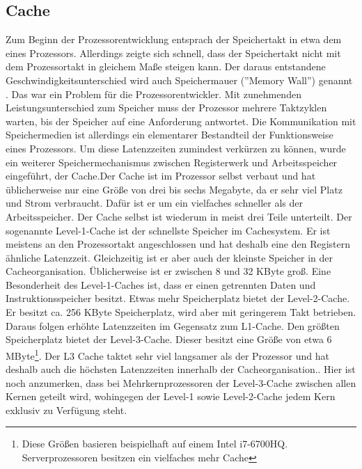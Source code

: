 \documentclass[a4paper,12pt]{article}
\begin{document}
\subsection{Cache} \label{subsec:cache}
Zum Beginn der Prozessorentwicklung entsprach der Speichertakt in etwa dem eines Prozessors. Allerdings zeigte sich schnell, dass der Speichertakt nicht mit dem Prozessortakt in gleichem Maße steigen kann. Der daraus entstandene Geschwindigkeitsunterschied wird auch Speichermauer (''Memory Wall'') genannt \cite{mckee2004reflections}.
Das war ein Problem für die Prozessorentwickler. Mit zunehmenden Leistungsunterschied zum Speicher muss der Prozessor mehrere Taktzyklen warten,  bis der Speicher auf eine Anforderung antwortet.\cite{mikroprozessortechnik2011} Die Kommunikation mit Speichermedien ist allerdings ein elementarer Bestandteil der Funktionsweise eines Prozessors. Um diese Latenzzeiten zumindest verkürzen zu können, wurde ein weiterer Speichermechanismus zwischen Registerwerk und Arbeitsspeicher eingeführt, der Cache.\newpage\noindent Der Cache ist im Prozessor selbst verbaut und hat üblicherweise nur eine Größe von drei bis sechs Megabyte, da er sehr viel Platz und Strom verbraucht. Dafür ist er um ein vielfaches schneller als der Arbeitsspeicher. Der Cache selbst ist wiederum in meist drei Teile unterteilt. Der sogenannte Level-1-Cache ist der schnellste Speicher im Cachesystem. Er ist meistens an den Prozessortakt angeschlossen und hat deshalb eine den Registern ähnliche Latenzzeit. Gleichzeitig ist er aber auch der kleinste Speicher in der Cacheorganisation. 
Üblicherweise ist er zwischen 8 und 32 KByte groß. Eine Besonderheit des Level-1-Caches ist, dass er  einen getrennten Daten und Instruktionsspeicher besitzt. Etwas mehr Speicherplatz bietet der Level-2-Cache. Er besitzt ca. 256 KByte Speicherplatz, wird aber mit geringerem Takt betrieben. Daraus folgen erhöhte Latenzzeiten im Gegensatz zum L1-Cache. Den größten Speicherplatz bietet der Level-3-Cache. Dieser besitzt eine Größe von etwa 6 MByte\footnote{Diese Größen basieren beispielhaft auf einem Intel i7-6700HQ. Serverprozessoren besitzen ein vielfaches mehr Cache}. Der L3 Cache taktet sehr viel langsamer als der Prozessor und hat deshalb auch die höchsten Latenzzeiten innerhalb der Cacheorganisation.\cite{molka2009memory}. Hier ist noch anzumerken, dass bei Mehrkernprozessoren der Level-3-Cache zwischen allen Kernen geteilt wird, wohingegen der Level-1 sowie Level-2-Cache jedem Kern exklusiv zu Verfügung steht.
\end{document}
